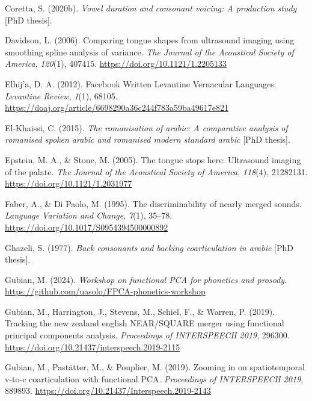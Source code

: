 \documentclass[
  man,
  longtable,
  nolmodern,
  notxfonts,
  notimes,
  colorlinks=true,linkcolor=blue,citecolor=blue,urlcolor=blue]{apa7}
\newlength{\cslhangindent}
\newenvironment{CSLReferences}[2] %
 {\begin{list}{}{%
  \setlength{\itemindent}{0pt}
  \setlength{\leftmargin}{0pt}
  \setlength{\parsep}{0pt}
  \ifodd #1
   \setlength{\leftmargin}{\cslhangindent}
   \setlength{\itemindent}{-1\cslhangindent}
  \fi
  \setlength{\itemsep}{#2\baselineskip}}}
 {\end{list}}
\begin{document}
\begin{CSLReferences}{1}{0}
Coretta, S. (2020b). \emph{Vowel duration and consonant voicing: A
production study} {[}PhD thesis{]}.

Davidson, L. (2006). Comparing tongue shapes from ultrasound imaging
using smoothing spline analysis of variance. \emph{The Journal of the
Acoustical Society of America}, \emph{120}(1), 407415.
\url{https://doi.org/10.1121/1.2205133}

Elhij'a, D. A. (2012). Facebook Written Levantine Vernacular Languages.
\emph{Levantine Review}, \emph{1}(1), 68105.
\url{https://doaj.org/article/6698290a36c244f783a59ba49617e821}

El-Khaissi, C. (2015). \emph{The romanisation of arabic: A comparative
analysis of romanised spoken arabic and romanised modern standard
arabic} {[}PhD thesis{]}.

Epstein, M. A., \& Stone, M. (2005). The tongue stops here: Ultrasound
imaging of the palate. \emph{The Journal of the Acoustical Society of
America}, \emph{118}(4), 21282131.
\url{https://doi.org/10.1121/1.2031977}

Faber, A., \& Di Paolo, M. (1995). The discriminability of nearly merged
sounds. \emph{Language Variation and Change}, \emph{7}(1), 35--78.
\url{https://doi.org/10.1017/S0954394500000892}

Ghazeli, S. (1977). \emph{Back consonants and backing coarticulation in
arabic} {[}PhD thesis{]}.

Gubian, M. (2024). \emph{Workshop on functional PCA for phonetics and
prosody}. \url{https://github.com/uasolo/FPCA-phonetics-workshop}

Gubian, M., Harrington, J., Stevens, M., Schiel, F., \& Warren, P.
(2019). Tracking the new zealand english NEAR/SQUARE merger using
functional principal components analysis. \emph{Proceedings of
INTERSPEECH 2019}, 296300.
\url{https://doi.org/10.21437/interspeech.2019-2115}

Gubian, M., Pastätter, M., \& Pouplier, M. (2019). Zooming in on
spatiotemporal v-to-c coarticulation with functional PCA.
\emph{Proceedings of INTERSPEECH 2019}, 889893.
\url{https://doi.org/10.21437/Interspeech.2019-2143}


\end{CSLReferences}
\end{document}
